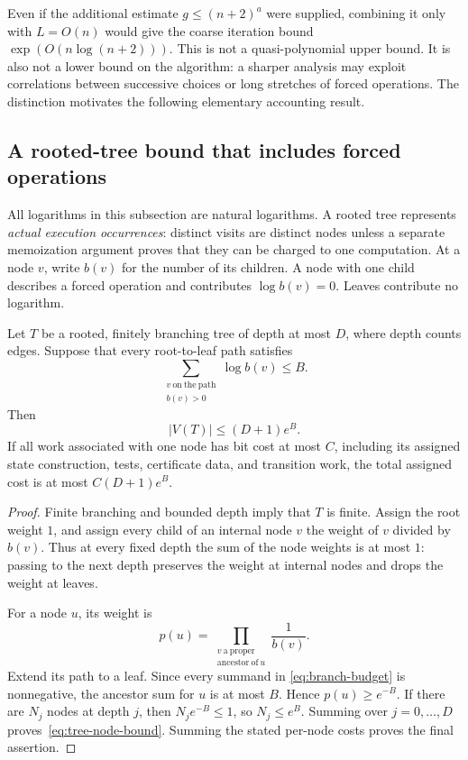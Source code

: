 Even if the additional estimate $g\leq(n+2)^a$ were supplied, combining it
only with $L=O(n)$ would give the coarse iteration bound
$\exp(O(n\log(n+2)))$.  This is not a quasi-polynomial upper bound.
It is also not a lower bound on the algorithm: a sharper analysis may
exploit correlations between successive choices or long stretches of
forced operations.  The distinction motivates the following elementary
accounting result.

\subsection{A rooted-tree bound that includes forced operations}

All logarithms in this subsection are natural logarithms.  A rooted tree
represents \emph{actual execution occurrences}: distinct visits are
distinct nodes unless a separate memoization argument proves that they
can be charged to one computation.  At a node $v$, write $b(v)$ for the
number of its children.  A node with one child describes a forced
operation and contributes $\log b(v)=0$.  Leaves contribute no logarithm.

\begin{theorem}
\label{thm:hierarchy-tree-accounting}
Let $T$ be a rooted, finitely branching tree of depth at most $D$, where
depth counts edges.  Suppose that every root-to-leaf path satisfies
\begin{equation}
 \sum_{\substack{v\ \mathrm{on\ the\ path}\\b(v)>0}}\log b(v)\leq B.
 \label{eq:branch-budget}
\end{equation}
Then
\begin{equation}
 |V(T)|\leq(D+1)e^B.
 \label{eq:tree-node-bound}
\end{equation}
If all work associated with one node has bit cost at most $C$, including
its assigned state construction, tests, certificate data, and transition
work, the total assigned cost is at most $C(D+1)e^B$.
\end{theorem}

\begin{proof}
Finite branching and bounded depth imply that $T$ is finite.  Assign the
root weight $1$, and assign every child of an internal node $v$ the
weight of $v$ divided by $b(v)$.  Thus at every fixed depth the sum of
the node weights is at most $1$: passing to the next depth preserves the
weight at internal nodes and drops the weight at leaves.

For a node $u$, its weight is
\[
 p(u)=
 \prod_{\substack{v\ \mathrm{a\ proper}\\\mathrm{ancestor\ of}\ u}}
 \frac1{b(v)}.
\]
Extend its path to a leaf.  Since every summand in
\eqref{eq:branch-budget} is nonnegative, the ancestor sum for $u$ is at
most $B$.  Hence $p(u)\geq e^{-B}$.  If there are $N_j$ nodes at depth
$j$, then $N_je^{-B}\leq1$, so $N_j\leq e^B$.  Summing over
$j=0,\ldots,D$ proves~\eqref{eq:tree-node-bound}.  Summing the stated
per-node costs proves the final assertion.
\end{proof}

